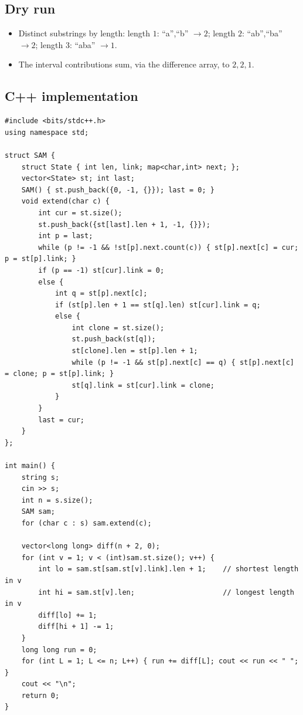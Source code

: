 \subsection*{Dry run}


\begin{itemize}
  \item Distinct substrings by length: length $1$: ``a'',``b'' $\to2$;
        length $2$: ``ab'',``ba'' $\to2$; length $3$: ``aba'' $\to1$.
  \item The interval contributions sum, via the difference array, to
        $2,2,1$.
\end{itemize}

\subsection*{C++ implementation}

\begin{lstlisting}
#include <bits/stdc++.h>
using namespace std;

struct SAM {
    struct State { int len, link; map<char,int> next; };
    vector<State> st; int last;
    SAM() { st.push_back({0, -1, {}}); last = 0; }
    void extend(char c) {
        int cur = st.size();
        st.push_back({st[last].len + 1, -1, {}});
        int p = last;
        while (p != -1 && !st[p].next.count(c)) { st[p].next[c] = cur; p = st[p].link; }
        if (p == -1) st[cur].link = 0;
        else {
            int q = st[p].next[c];
            if (st[p].len + 1 == st[q].len) st[cur].link = q;
            else {
                int clone = st.size();
                st.push_back(st[q]);
                st[clone].len = st[p].len + 1;
                while (p != -1 && st[p].next[c] == q) { st[p].next[c] = clone; p = st[p].link; }
                st[q].link = st[cur].link = clone;
            }
        }
        last = cur;
    }
};

int main() {
    string s;
    cin >> s;
    int n = s.size();
    SAM sam;
    for (char c : s) sam.extend(c);

    vector<long long> diff(n + 2, 0);
    for (int v = 1; v < (int)sam.st.size(); v++) {
        int lo = sam.st[sam.st[v].link].len + 1;    // shortest length in v
        int hi = sam.st[v].len;                     // longest length in v
        diff[lo] += 1;
        diff[hi + 1] -= 1;
    }
    long long run = 0;
    for (int L = 1; L <= n; L++) { run += diff[L]; cout << run << " "; }
    cout << "\n";
    return 0;
}
\end{lstlisting}

